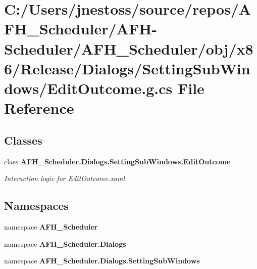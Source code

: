 \section{C\+:/\+Users/jnestoss/source/repos/\+A\+F\+H\+\_\+\+Scheduler/\+A\+F\+H-\/\+Scheduler/\+A\+F\+H\+\_\+\+Scheduler/obj/x86/\+Release/\+Dialogs/\+Setting\+Sub\+Windows/\+Edit\+Outcome.g.\+cs File Reference}
\label{x86_2_release_2_dialogs_2_setting_sub_windows_2_edit_outcome_8g_8cs}
\subsection*{Classes}
\begin{DoxyCompactItemize}
\item 
class \textbf{ A\+F\+H\+\_\+\+Scheduler.\+Dialogs.\+Setting\+Sub\+Windows.\+Edit\+Outcome}
\begin{DoxyCompactList}\small\item\em Interaction logic for Edit\+Outcome.\+xaml \end{DoxyCompactList}\end{DoxyCompactItemize}
\subsection*{Namespaces}
\begin{DoxyCompactItemize}
\item 
namespace \textbf{ A\+F\+H\+\_\+\+Scheduler}
\item 
namespace \textbf{ A\+F\+H\+\_\+\+Scheduler.\+Dialogs}
\item 
namespace \textbf{ A\+F\+H\+\_\+\+Scheduler.\+Dialogs.\+Setting\+Sub\+Windows}
\end{DoxyCompactItemize}

